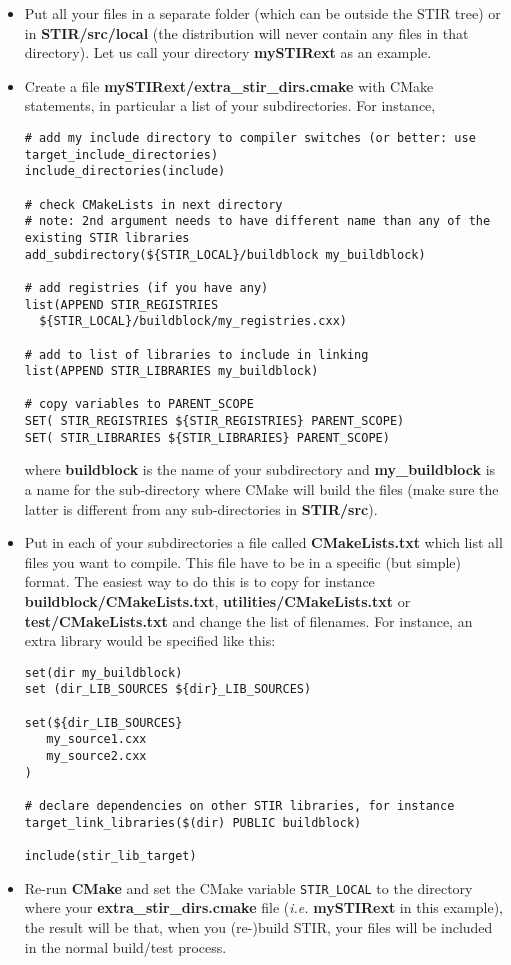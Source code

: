 \documentclass{article}
\begin{document}
\begin{itemize}
\item Put all your files in a separate folder (which can be outside the STIR tree) or in \textbf{STIR/src/local} (the distribution 
will never contain any files in that directory). Let us call your directory 
\textbf{mySTIRext} as an example.
\item Create a file \textbf{mySTIRext/extra\_stir\_dirs.cmake} with CMake statements,
in particular a list of your subdirectories. For instance,
\begin{verbatim}
# add my include directory to compiler switches (or better: use target_include_directories)
include_directories(include)

# check CMakeLists in next directory
# note: 2nd argument needs to have different name than any of the existing STIR libraries
add_subdirectory(${STIR_LOCAL}/buildblock my_buildblock)

# add registries (if you have any)
list(APPEND STIR_REGISTRIES 
  ${STIR_LOCAL}/buildblock/my_registries.cxx)

# add to list of libraries to include in linking
list(APPEND STIR_LIBRARIES my_buildblock)

# copy variables to PARENT_SCOPE
SET( STIR_REGISTRIES ${STIR_REGISTRIES} PARENT_SCOPE)
SET( STIR_LIBRARIES ${STIR_LIBRARIES} PARENT_SCOPE)

\end{verbatim}
where \textbf{buildblock} is the name of your subdirectory and \textbf{my\_buildblock} is a name for the
sub-directory where CMake will build the files (make sure the latter is different from any
sub-directories in \textbf{STIR/src}).

\item Put in each of your subdirectories a file called \textbf{CMakeLists.txt}
which list all files you want to compile. This file have to 
be in a specific (but simple) format. The easiest way to do this 
is to copy for instance \textbf{buildblock/CMakeLists.txt}, \textbf{utilities/CMakeLists.txt}
or  \textbf{test/CMakeLists.txt} and change the list of filenames. For instance, an extra library
would be specified like this:
\begin{verbatim}
set(dir my_buildblock)
set (dir_LIB_SOURCES ${dir}_LIB_SOURCES)

set(${dir_LIB_SOURCES}
   my_source1.cxx
   my_source2.cxx
)

# declare dependencies on other STIR libraries, for instance
target_link_libraries($(dir) PUBLIC buildblock)

include(stir_lib_target)
\end{verbatim}

\item Re-run \textbf{CMake} and set the CMake variable \texttt{STIR\_LOCAL} to the directory where your
\textbf{extra\_stir\_dirs.cmake} file (\textit{i.e.} \textbf{mySTIRext} in this example),
the result will be that, when you (re-)build STIR, your files will be included in 
the normal build/test process.
\end{itemize}
\end{document}
